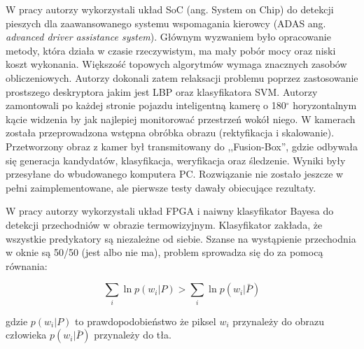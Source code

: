 
W pracy \cite{piao2016real} autorzy wykorzystali układ SoC (ang. System on Chip) do detekcji pieszych dla zaawansowanego systemu wspomagania kierowcy (ADAS ang. \textit{advanced driver assistance system}). 
Głównym wyzwaniem było opracowanie metody, która działa w czasie rzeczywistym, ma mały pobór mocy oraz niski koszt wykonania. %
Większość topowych algorytmów wymaga znacznych zasobów obliczeniowych. %
Autorzy dokonali zatem relaksacji problemu poprzez zastosowanie prostszego deskryptora jakim jest LBP oraz klasyfikatora SVM. 
Autorzy zamontowali po każdej stronie pojazdu inteligentną kamerę o 180$^\circ$ horyzontalnym kącie widzenia by jak najlepiej monitorować przestrzeń wokół niego. %
W kamerach została przeprowadzona wstępna obróbka obrazu (rektyfikacja i skalowanie). %
Przetworzony obraz z kamer był transmitowany do ,,Fusion-Box'', gdzie odbywała się generacja kandydatów, klasyfikacja, weryfikacja oraz śledzenie. 
Wyniki były przesyłane do wbudowanego komputera PC. 
Rozwiązanie nie zostało jeszcze w pełni zaimplementowane, ale pierwsze testy dawały obiecujące rezultaty.

W pracy \cite{xiao_2015} autorzy wykorzystali układ FPGA i naiwny klasyfikator Bayesa do detekcji przechodniów w obrazie termowizyjnym. 
Klasyfikator zakłada, że wszystkie predykatory są niezależne od siebie. 
Szanse na wystąpienie przechodnia w oknie są 50/50 (jest albo nie ma), problem sprowadza się do za pomocą równania: %

\begin{equation} \label{eq:bayes_china}
\sum_i \ln p(w_i|P) > \sum_i \ln p(w_i|\bar{P})
\end{equation}

\noindent gdzie \( p(w_i|P) \) to prawdopodobieństwo że piksel $w_i$ przynależy do obrazu człowieka
\( p(w_i|\bar{P}) \) przynależy do tła.

